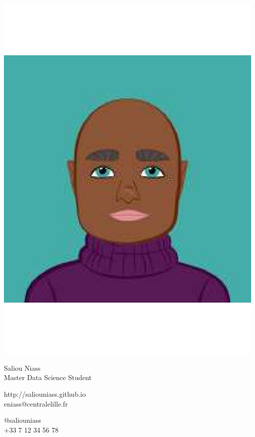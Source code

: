 \documentclass{article}
\begin{document}
\centering \includegraphics[width=.25\linewidth]{logo}\\[5pt]
\parbox{2in}{\Large \centering Saliou Niass\\[1pt]
\normalsize Master Data Science Student}

\vfill
\raggedright
\begin{multicols}{2}
http://saliouniass.github.io\\
eniass@centralelille.fr

\columnbreak
\raggedleft
@saliouniass\\
+33 7 12 34 56 78%
\end{multicols}%
\end{document}
